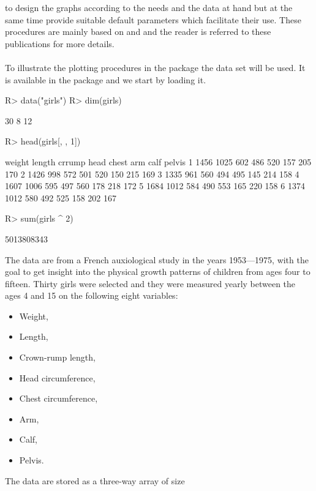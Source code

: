 \documentclass[article,shortnames, nojss]{jss}
\newcommand{\bi}{\begin{itemize}}
\newcommand{\ei}{\end{itemize}}
\begin{document}
to design the graphs according to the needs and the data at hand
but at the same time provide suitable default parameters which
facilitate their use. These procedures are mainly based on
\citet{kiers2000some} and \citet{kroonenberg:2008} and the reader
is referred to these publications for more details. \\\\
To illustrate the plotting procedures in the package the data set
 \citep{kroonenberg:2008} will be used. It is available
in the package and we start by loading it.
\begin{Schunk}
\begin{Sinput}
R> data("girls")
R> dim(girls)
\end{Sinput}
\begin{Soutput}
[1] 30  8 12
\end{Soutput}
\begin{Sinput}
R> head(girls[, , 1])
\end{Sinput}
\begin{Soutput}
  weight length crrump head chest arm calf pelvis
1   1456   1025    602  486   520 157  205    170
2   1426    998    572  501   520 150  215    169
3   1335    961    560  494   495 145  214    158
4   1607   1006    595  497   560 178  218    172
5   1684   1012    584  490   553 165  220    158
6   1374   1012    580  492   525 158  202    167
\end{Soutput}
\begin{Sinput}
R> sum(girls ^ 2)
\end{Sinput}
\begin{Soutput}
[1] 5013808343
\end{Soutput}
\end{Schunk}
The data are from a French auxiological study in the years 1953---1975,
\citep{sempe:1987} with the goal to
get insight into the physical growth patterns of children from ages
four to fifteen. Thirty girls were selected and they were measured
yearly between the ages 4 and 15 on the following eight variables:
\bi
\item 	Weight,
\item 	Length,
\item	Crown-rump length,
\item	Head circumference,
\item	Chest circumference,
\item	Arm,
\item	Calf,
\item	Pelvis.
\ei
The data are stored as a three-way array of size
\end{document}
